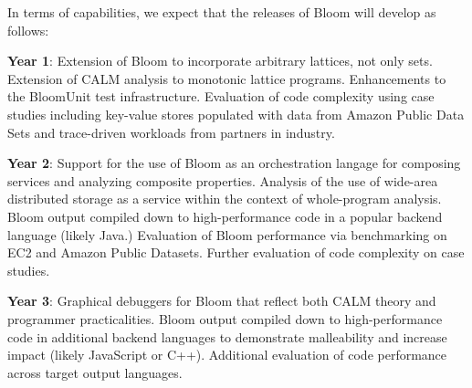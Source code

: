 In terms of capabilities, we expect that the releases of Bloom will develop as follows: 
\begin{tightitemize}
\item\textbf{Year 1}: Extension of Bloom to incorporate arbitrary lattices, not only sets.  Extension of CALM analysis to monotonic lattice programs.  Enhancements to the BloomUnit test infrastructure.  Evaluation of code complexity using case studies including key-value stores populated with data from Amazon Public Data Sets and trace-driven workloads from partners in industry. 

\item\textbf{Year 2}: Support for the use of Bloom as an orchestration langage for composing services and analyzing composite properties.  Analysis of the use of wide-area distributed storage as a service within the context of whole-program analysis.  Bloom output compiled down to high-performance code in a popular backend language (likely Java.)  Evaluation of Bloom performance via benchmarking on EC2 and Amazon Public Datasets.  Further evaluation of code complexity on case studies.

\item\textbf{Year 3}: Graphical debuggers for Bloom that reflect both CALM theory and programmer practicalities.  Bloom output compiled down to high-performance code in additional backend languages to demonstrate malleability and increase impact (likely JavaScript or C++).  Additional evaluation of code performance across target output languages.
\end{tightitemize}


% 

